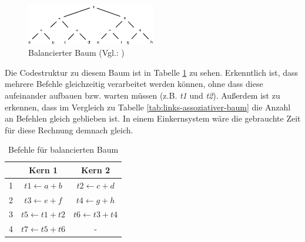 \begin{figure}
	\begin{center}
		\includegraphics[width=0.5\textwidth]{images/balanced}
	\end{center}
	\caption[Balancierter Baum]{Balancierter Baum (Vgl.: \cite{HeBIS-309344573})}
	\label{fig:balancierter-baum}
\end{figure}

Die Codestruktur zu diesem Baum ist in Tabelle \ref{tab:balancierter-baum} zu sehen. Erkenntlich ist, dass mehrere Befehle gleichzeitig verarbeitet werden können, ohne dass diese aufeinander aufbauen bzw. warten müssen (z.B. \textit{t1} und \textit{t2}). Außerdem ist zu erkennen, dass im Vergleich zu Tabelle \ref{tab:links-assoziativer-baum} die Anzahl an Befehlen gleich geblieben ist. In einem Einkernsystem wäre die gebrauchte Zeit für diese Rechnung demnach gleich.

\begin{table}
	\begin{center}
		\begin{tabular}{|c|c|c|}
			\hline  & Kern 1 & Kern 2 \\ 
			\hline 1 & $ t1 \leftarrow a + b $ & $ t2 \leftarrow c + d $ \\ 
			\hline 2 & $ t3 \leftarrow e + f $ & $ t4 \leftarrow g + h $ \\ 
			\hline 3 & $ t5 \leftarrow t1 + t2 $ & $ t6 \leftarrow t3 + t4 $\\ 
			\hline 4 & $ t7 \leftarrow t5 + t6 $ &  -\\ 
			\hline 
		\end{tabular}
	\end{center}
	\caption{Befehle für balancierten Baum}
	\label{tab:balancierter-baum}
\end{table}